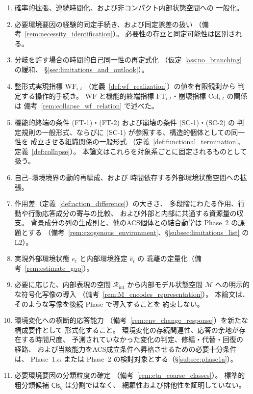 \begin{enumerate}[label=(\arabic*)]
  \item 確率的拡張、連続時間化、および非コンパクト内部状態空間への
  一般化。

  \item 必要環境要因の経験的同定手続き、および同定誤差の扱い
  （備考~\ref{rem:necessity_identification}）。
  必要性の存立と同定可能性は区別される。

  \item 分岐を許す場合の時間的自己同一性の再定式化
  （仮定~\ref{ass:no_branching} の緩和、
  \S\ref{sec:limitations_and_outlook}）。

  \item 整形式実現指標 $\mathrm{WF}_{i,t}$
  （定義~\ref{def:wf_realization}）の値を有限観測から
  判定する操作的手続き。
  $\mathrm{WF}$ と機能的終端指標 $\mathrm{FT}_{i,t}$・崩壊指標 $\mathrm{Col}_{i,t}$ の関係は
  備考~\ref{rem:collapse_wf_relation} で述べた。

  \item 機能的終端の条件 (FT-1)・(FT-2) および崩壊の条件 (SC-1)・(SC-2) の
  判定規則の一般形式、ならびに (SC-1) が参照する、構造的個体としての同一性を
  成立させる組織関係の一般形式
  （定義~\ref{def:functional_termination}、定義~\ref{def:collapse}）。
  本論文はこれらを対象系ごとに固定されるものとして扱う。

  \item 自己--環境境界の動的再編成、および
  時間依存する外部環境状態空間への拡張。

  \item 作用差（定義~\ref{def:action_difference}）の大きさ、
  多段階にわたる作用、行動や行動応答成分の寄与の比較、
  および外部と内部に共通する資源量の収支。
  背景成分の列の生成則と、他のACS個体との結合動学は Phase~2 の課題とする
  （備考~\ref{rem:exogenous_environment}、\S\ref{subsec:limitations_list} の L2）。

  \item 実現外部環境状態 $e_t$ と内部環境推定 $\hat{e}_t$ の
  乖離の定量化（備考~\ref{rem:estimate_gap}）。

  \item 必要に応じた、内部表現の空間
  $\mathcal{R}_{\mathrm{int}}$ から内部モデル状態空間
  $\mathcal{M}$ への明示的な符号化写像の導入
  （備考~\ref{rem:M_encodes_representation}）。
  本論文は、そのような写像を後続 Phase で導入することを
  約束しない。

  \item 環境変化への横断的応答能力
  （備考~\ref{rem:env_change_response}）を新たな構成要件として
  形式化すること。
  環境変化の存続関連性、応答の余地が存在する時間尺度、
  予測されていなかった変化の判定、修繕・代替・回復の経路、
  および当該能力をACS成立条件へ昇格させるための必要十分条件は、
  Phase~1.$\alpha$ または Phase~2 の検討対象とする（\S\ref{subsec:phase1a}）。

  \item 必要環境要因の分類粒度の確定
  （備考~\ref{rem:eta_coarse_classes}）。
  標準的粗分類候補 $\mathsf{Cls}_\eta$ は分割ではなく、
  網羅性および排他性を証明していない。
\end{enumerate}

